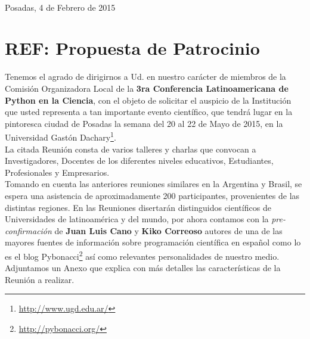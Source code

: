 \documentclass[11pt,a4paper]{report}
\begin{document}
\begin{center}
\end{center}



\hfill \\[0.2cm] Posadas, 4 de Febrero de 2015\\[0.4cm]

\section*{REF: Propuesta de Patrocinio}

Tenemos el agrado de dirigirnos a Ud. en nuestro carácter de miembros de la Comisión Organizadora Local de la
\textbf{3ra Conferencia Latinoamericana de Python en la Ciencia}, con el objeto de solicitar el auspicio de
la Institución que usted representa a tan importante evento científico, que tendrá lugar en la pintoresca ciudad
de Posadas la semana del 20 al 22 de Mayo de 2015, en la Universidad Gastón Dachary\footnote{\url{http://www.ugd.edu.ar/}}. \\

La citada Reunión consta de varios talleres y charlas  que convocan a
Investigadores, Docentes de los diferentes niveles educativos,
Estudiantes, Profesionales y Empresarios. \\[0.2cm]

Tomando en cuenta las anteriores reuniones similares en la Argentina y
Brasil, se espera una asistencia de aproximadamente 200 participantes,
provenientes de las distintas regiones. En las Reuniones
disertarán distinguidos científicos de Universidades de latinoamérica y
del mundo, por ahora contamos con la \emph{pre-confirmación} de
\textbf{Juan Luis Cano} y \textbf{Kiko Correoso} autores de una de las
mayores fuentes de información sobre programación científica en español
como lo es el blog Pybonacci\footnote{\url{http://pybonacci.org/}} así
como relevantes personalidades de nuestro medio. Adjuntamos un Anexo
que explica con más detalles las características de la
Reunión a realizar.\\[0.2cm]
\end{document}
